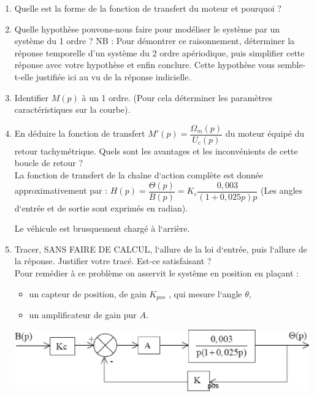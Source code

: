 \begin{enumerate}
\item Quelle est la forme de la fonction de transfert du moteur et pourquoi ?

\item Quelle hypothèse pouvons-nous faire pour modéliser le système par un
système du 1
ordre ?
NB : Pour démontrer ce raisonnement, déterminer la réponse temporelle d’un
système
du 2 ordre apériodique, puis simplifier cette réponse avec votre
hypothèse et enfin
conclure.
Cette hypothèse vous semble-t-elle justifiée ici au vu de la réponse indicielle.


\item Identifier $M(p)$ à un 1 ordre. (Pour cela déterminer les
paramètres caractéristiques sur la courbe).


\item En déduire la fonction de transfert $M'(p)=\dfrac{\Omega_m(p)}{U_c(p)}$
du moteur équipé du retour                                                 
tachymétrique. Quels sont les avantages et les inconvénients de cette boucle de
retour ?\\

La fonction de transfert de la chaîne d‘action complète est donnée
approximativement par :
$H(p)=\dfrac{\Theta(p)}{B(p)}=K_c\dfrac{0,003}{\left(1+0,025p \right)p}$    
(Les angles d‘entrée et de sortie sont exprimés en radian).

Le véhicule est brusquement chargé à l‘arrière.


\item Tracer, SANS FAIRE DE CALCUL, l‘allure de la loi d‘entrée, puis l‘allure
de la réponse.
Justifier votre tracé. Est-ce satisfaisant ?\\


Pour remédier à ce problème on asservit le système en position en plaçant :
\begin{itemize}
 \item un capteur de position, de gain $K_{pos}$ , qui mesure l‘angle $\theta$,
\item un amplificateur de gain pur $A$.
\end{itemize}

\begin{center}
 \includegraphics[width=.6\textwidth]{png/image6}
\end{center}



\end{enumerate}
